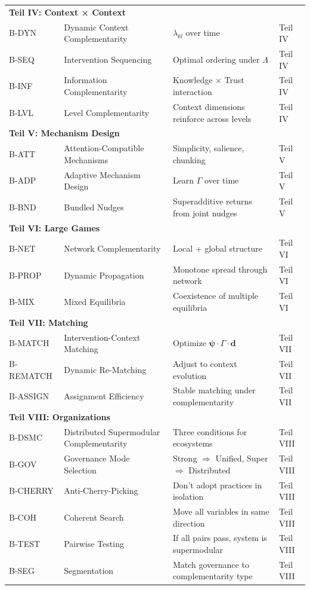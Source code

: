 \begin{longtable}{p{2cm}p{4cm}p{6.5cm}p{2cm}}
\multicolumn{4}{l}{\textbf{Teil IV: Context × Context}} \\
B-DYN & Dynamic Context Complementarity & $\lambda_{kl}$ over time & Teil IV \\
B-SEQ & Intervention Sequencing & Optimal ordering under $\Lambda$ & Teil IV \\
B-INF & Information Complementarity & Knowledge × Trust interaction & Teil IV \\
B-LVL & Level Complementarity & Context dimensions reinforce across levels & Teil IV \\
\midrule

\multicolumn{4}{l}{\textbf{Teil V: Mechanism Design}} \\
B-ATT & Attention-Compatible Mechanisms & Simplicity, salience, chunking & Teil V \\
B-ADP & Adaptive Mechanism Design & Learn $\Gamma$ over time & Teil V \\
B-BND & Bundled Nudges & Superadditive returns from joint nudges & Teil V \\
\midrule

\multicolumn{4}{l}{\textbf{Teil VI: Large Games}} \\
B-NET & Network Complementarity & Local + global structure & Teil VI \\
B-PROP & Dynamic Propagation & Monotone spread through network & Teil VI \\
B-MIX & Mixed Equilibria & Coexistence of multiple equilibria & Teil VI \\
\midrule

\multicolumn{4}{l}{\textbf{Teil VII: Matching}} \\
B-MATCH & Intervention-Context Matching & Optimize $\boldsymbol{\psi} \cdot \Gamma \cdot \mathbf{d}$ & Teil VII \\
B-REMATCH & Dynamic Re-Matching & Adjust to context evolution & Teil VII \\
B-ASSIGN & Assignment Efficiency & Stable matching under complementarity & Teil VII \\
\midrule

\multicolumn{4}{l}{\textbf{Teil VIII: Organizations}} \\
B-DSMC & Distributed Supermodular Complementarity & Three conditions for ecosystems & Teil VIII \\
B-GOV & Governance Mode Selection & Strong $\Rightarrow$ Unified, Super $\Rightarrow$ Distributed & Teil VIII \\
B-CHERRY & Anti-Cherry-Picking & Don't adopt practices in isolation & Teil VIII \\
B-COH & Coherent Search & Move all variables in same direction & Teil VIII \\
B-TEST & Pairwise Testing & If all pairs pass, system is supermodular & Teil VIII \\
B-SEG & Segmentation & Match governance to complementarity type & Teil VIII \\


\end{longtable}

